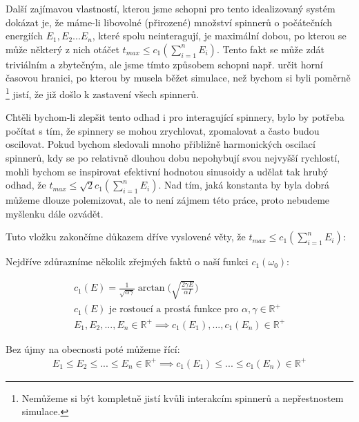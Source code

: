 \documentclass[12pt, a4paper,
 twoside,        %
 openright
]{report}
\begin{document}
Další zajímavou vlastností, kterou jsme schopni pro tento idealizovaný systém dokázat je, že máme-li libovolné (přirozené) množství spinnerů o počátečních energiích $E_1, E_2 ... E_n$, které spolu neinteragují, je maximální dobou, po kterou se může některý z nich otáčet $t_{max} \leq c_1(\sum_{i=1}^n E_i)$. Tento fakt se může zdát triviálním a zbytečným, ale jsme tímto způsobem schopni např. určit horní časovou hranici, po kterou by musela běžet simulace, než bychom si byli poměrně \footnote{Nemůžeme si být kompletně jistí kvůli interakcím spinnerů a nepřestnostem simulace.} jistí, že již došlo k zastavení všech spinnerů.

Chtěli bychom-li zlepšit tento odhad i pro interagující spinnery, bylo by potřeba počítat s tím, že spinnery se mohou zrychlovat, zpomalovat a často budou oscilovat. Pokud bychom sledovali mnoho přibližně harmonických oscilací spinnerů, kdy se po relativně dlouhou dobu nepohybují svou nejvyšší rychlostí, mohli bychom se inspirovat efektivní hodnotou sinusoidy a udělat tak hrubý odhad, že $t_{max} \leq \sqrt{2} c_1(\sum_{i=1}^n E_i)$. Nad tím, jaká konstanta by byla dobrá můžeme dlouze polemizovat, ale to není zájmem této práce, proto nebudeme myšlenku dále ozvádět.

Tuto vložku zakončíme důkazem dříve vyslovené věty, že $t_{max} \leq c_1(\sum_{i=1}^n E_i)$:

Nejdříve zdůrazníme několik zřejmých faktů o naší funkci $c_1(\omega_0)$:

\begin{equation}
    \label{eq:max_runtime_proof_p1}
    \begin{gathered}
        c_1(E) = \frac{1}{\sqrt{\alpha\gamma}} \arctan{ \bigg( \sqrt{\frac{2 \gamma E}{\alpha I}} \bigg)} \\
        c_1(E) \text{ je rostoucí a prostá funkce pro } \alpha, \gamma \in \mathbb{R}^+ \\
        E_1, E_2, ..., E_n \in \mathbb{R}^+ \implies c_1(E_1), ..., c_1(E_n) \in \mathbb{R}^+
    \end{gathered}
\end{equation}

Bez újmy na obecnosti poté můžeme řící:
\begin{equation}
    \label{eq:max_runtime_proof_p2}
    \begin{gathered}
        E_1 \leq E_2 \leq ... \leq E_n \in \mathbb{R}^+ \implies c_1(E_1) \leq ... \leq c_1(E_n) \in \mathbb{R}^+
    \end{gathered}
\end{equation}
\end{document}

